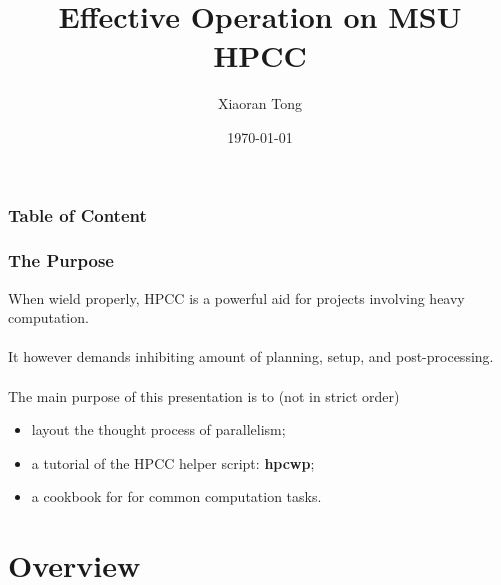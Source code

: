 \documentclass{beamer}
\title[Effective HPCC]{Effective Operation on MSU HPCC} %
\author{Xiaoran Tong} %
\institute[EPI Biosta, MSU] %
{
Department of Epidemiology and Biostatistics
Michigan State University \\ %
\medskip
\textit{tongxia1@msu.com} %
}
\date{\today} %
\begin{document}
\begin{frame}
\titlepage %
\end{frame}

\begin{frame}
\frametitle{Table of Content} %
\tableofcontents %
\end{frame}


\begin{frame}
\frametitle{The Purpose}
When wield properly, HPCC is a powerful aid for projects involving heavy computation.\\~\\

It however demands inhibiting amount of planning, setup, and post-processing. \\~\\

The main purpose of this presentation is to (not in strict order)
\begin{itemize}
\item layout the thought process of parallelism;
\item a tutorial of the HPCC helper script: \textbf{hpcwp};
\item a cookbook for for common computation tasks.
\end{itemize}

\end{frame}

\section{Overview} %
\end{document}
